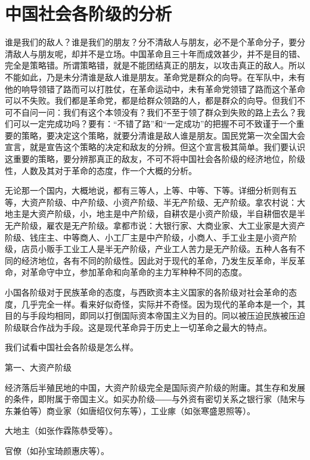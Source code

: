\section[中国社会各阶级的分析（一九二六年）]{中国社会各阶级的分析}


谁是我们的敌人？谁是我们的朋友？分不清敌人与朋友，必不是个革命分子，要分清敌人与朋友呢，却并不是立场。中国革命且三十年而成效甚少，并不是目的错、完全是策略错。所谓策略错，就是不能团结真正的朋友，以攻击真正的敌人。所以不能如此，乃是未分清谁是敌人谁是朋友。革命党是群众的向导。在军队中，未有他的响导领错了路而可以打胜仗，在革命运动中，未有革命党领错了路而这个革命可以不失败。我们都是革命党，都是给群众领路的人，都是群众的向导。但我们不可不自问一问：我们有这个本领没有？我们不至于领了群众到失败的路上去么？我们可以一定完成功吗？要有：“不错了路”和“一定成功”的把握不可不致谨于一个重要的策略，要决定这个策略，就要分清谁是敌人谁是朋友。国民党第一次全国大会宣言，就是宣告这个策略的决定和敌友的分辨。但这个宣言极其简单。我们要认识这重要的策略，要分辨那真正的敌友，不可不将中国社会各阶级的经济地位，阶级性，人数及其对于革命的态度，作一个大概的分析。

无论那一个国内，大概地说，都有三等人，上等、中等、下等。详细分析则有五等，大资产阶级、中产阶级、小资产阶级、半无产阶级、无产阶级。拿农村说：大地主是大资产阶级，小，地主是中产阶级，自耕农是小资产阶级，半自耕佃农是半无产阶级，雇农是无产阶级。拿都市说：大银行家、大商业家、大工业家是大资产阶级、钱庄主、中等商人、小工厂主是中产阶级，小商人、手工业主是小资产阶级，店员小贩手工业工人是半无产阶级，产业工人苦力是无产阶级。五种人各有不同的经济地位，各有不同的阶级性。因此对于现代的革命，乃发生反革命，半反革命，对革命守中立，参加革命和向革命的主力军种种不同的态度。

小国各阶级对于民族革命的态度，与西欧资本主义国家的各阶级对社会革命的态度，几乎完全一样。看来好似奇怪，实际并不奇怪。因为现代的革命本是一个，其目的与手段均相同，即同以打倒国际资本帝国主义为目的。同以被压迫民族被压迫阶级联合作战为手段。这是现代革命异于历史上一切革命之最大的特点。

我们试看中国社会各阶级是怎么样。


第一、大资产阶级

经济落后半殖民地的中国，大资产阶级完全是国际资产阶级的附庸。其生存和发展的条件，即附属于帝国主义。如买办阶级――与外资有密切关系之银行家（陆宋与东兼伯等）商业家（如唐绍仪何东等），工业瘃（如张寒盛恩照等）。

大地主（如张作霖陈恭受等）。

官僚（如孙宝琦颜惠庆等）。

